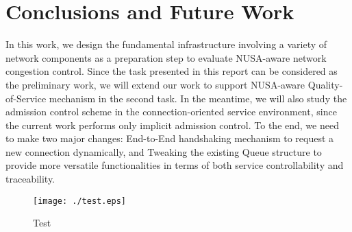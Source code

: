 \documentclass[letterpaper, 10 pt, conference]{ieeeconf}  %
\begin{document}
\section{Conclusions and Future Work}
\label{sec:concl}
\noindent 
In this work, we design the fundamental infrastructure involving a variety of
network components as a preparation step to evaluate NUSA-aware network
congestion control. Since the task presented in this report can be considered
as the preliminary work, we will extend our work to support NUSA-aware
Quality-of-Service mechanism in the second task. In the meantime, we will also
study the admission control scheme in the connection-oriented service
environment, since the current work performs only implicit admission control.
To the end, we need to make two major changes: End-to-End handshaking mechanism
to request a new connection dynamically, and Tweaking the existing Queue
structure to provide more versatile functionalities in terms of both service
controllability and traceability.

\begin{figure}[t]
\centering
\texttt{[image: ./test.eps]}
\caption{
Test
}
\label{fig:test}
\end{figure}
\end{document}
